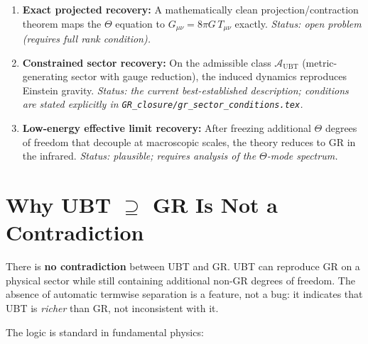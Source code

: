 \documentclass[12pt]{article}
\theoremstyle{definition}
\theoremstyle{remark}
\begin{document}
\begin{enumerate}
  \item \textbf{Exact projected recovery:} A mathematically clean
    projection/contraction theorem maps the $\Theta$ equation to
    $G_{\mu\nu} = 8\pi G\, T_{\mu\nu}$ exactly.
    \emph{Status: open problem (requires full rank condition).}

  \item \textbf{Constrained sector recovery:} On the admissible class
    $\mathcal{A}_{\mathrm{UBT}}$ (metric-generating sector with gauge
    reduction), the induced dynamics reproduces Einstein gravity.
    \emph{Status: the current best-established description;
    conditions are stated explicitly in
    \texttt{GR\_closure/gr\_sector\_conditions.tex}.}

  \item \textbf{Low-energy effective limit recovery:} After freezing
    additional $\Theta$ degrees of freedom that decouple at macroscopic
    scales, the theory reduces to GR in the infrared.
    \emph{Status: plausible; requires analysis of the $\Theta$-mode
    spectrum.}
\end{enumerate}

\section{Why UBT $\supseteq$ GR Is Not a Contradiction}
\label{sec:no_contradiction}

\begin{tcolorbox}[colback=green!8!white,colframe=green!60!black,
                  title=Consistency Statement]
There is \textbf{no contradiction} between UBT and GR.  UBT can reproduce GR
on a physical sector while still containing additional non-GR degrees of
freedom.  The absence of automatic termwise separation is a feature, not a
bug: it indicates that UBT is \emph{richer} than GR, not inconsistent with it.
\end{tcolorbox}

The logic is standard in fundamental physics:
\end{document}
